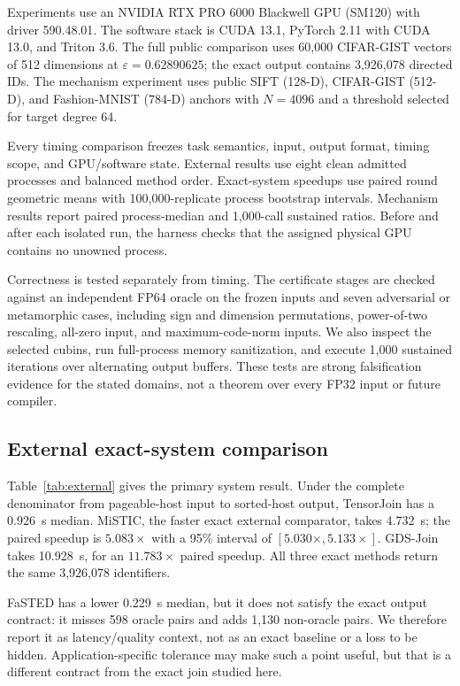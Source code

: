 \documentclass[sigconf,review,anonymous]{acmart}
\newcommand{\system}{TensorJoin\xspace}
\begin{document}
Experiments use an NVIDIA RTX PRO 6000 Blackwell GPU (SM120) with driver
590.48.01.  The software stack is CUDA 13.1, PyTorch 2.11 with CUDA 13.0, and
Triton 3.6.  The full public comparison uses 60,000 CIFAR-GIST vectors of 512
dimensions at $\varepsilon=0.62890625$; the exact output contains 3,926,078
directed IDs.  The mechanism experiment uses public SIFT (128-D), CIFAR-GIST
(512-D), and Fashion-MNIST (784-D) anchors with $N=4096$ and a threshold
selected for target degree 64.

Every timing comparison freezes task semantics, input, output format, timing
scope, and GPU/software state.  External results use eight clean admitted
processes and balanced method order.  Exact-system speedups use paired round
geometric means with 100,000-replicate process bootstrap intervals.  Mechanism
results report paired process-median and 1,000-call sustained ratios.  Before
and after each isolated run, the harness checks that the assigned physical GPU
contains no unowned process.

Correctness is tested separately from timing.  The certificate stages are
checked against an independent FP64 oracle on the frozen inputs and seven
adversarial or metamorphic cases, including sign and dimension permutations,
power-of-two rescaling, all-zero input, and maximum-code-norm inputs.  We also
inspect the selected cubins, run full-process memory sanitization, and execute
1,000 sustained iterations over alternating output buffers.  These tests are
strong falsification evidence for the stated domains, not a theorem over every
FP32 input or future compiler.

\subsection{External exact-system comparison}

Table~\ref{tab:external} gives the primary system result.  Under the complete
denominator from pageable-host input to sorted-host output, \system has a
0.926~s median.  MiSTIC, the faster exact external comparator, takes 4.732~s;
the paired speedup is $5.083\times$ with a 95\% interval of
$[5.030\times,5.133\times]$.  GDS-Join takes 10.928~s, for an
$11.783\times$ paired speedup.  All three exact methods return the same
3,926,078 identifiers.



FaSTED has a lower 0.229~s median, but it does not satisfy the exact output
contract: it misses 598 oracle pairs and adds 1,130 non-oracle pairs.  We
therefore report it as latency/quality context, not as an exact baseline or a
loss to be hidden.  Application-specific tolerance may make such a point
useful, but that is a different contract from the exact join studied here.
\end{document}
